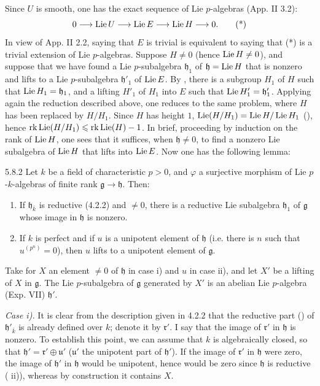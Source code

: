Since $U$ is smooth, one has the exact sequence of Lie $p$-algebras (App. II 3.2):
\[
 0\longrightarrow\operatorname{Lie} U\longrightarrow\operatorname{Lie} E\longrightarrow\operatorname{Lie} H\longrightarrow0.\tag{*}
\]
In view of App. II 2.2, saying that $E$ is trivial is equivalent to saying that (*) is a trivial extension of Lie $p$-algebras. Suppose $H\ne0$ (hence $\operatorname{Lie} H\ne0$), and suppose that we have found a Lie $p$-subalgebra $\mathfrak h_1$ of $\mathfrak h=\operatorname{Lie} H$ that is nonzero and lifts to a Lie $p$-subalgebra $\mathfrak h'_1$ of $\operatorname{Lie} E$. By \loccit, there is a subgroup $H_1$ of $H$ such that $\operatorname{Lie} H_1=\mathfrak h_1$, and a lifting $H'_1$ of $H_1$ into $E$ such that $\operatorname{Lie} H'_1=\mathfrak h'_1$. Applying again the reduction described above, one reduces to the same problem, where $H$ has been replaced by $H/H_1$. Since $H$ has height $1$, $\operatorname{Lie}(H/H_1)=\operatorname{Lie} H/\operatorname{Lie} H_1$ (\loccit), hence $\operatorname{rk}\operatorname{Lie}(H/H_1)\leqslant\operatorname{rk}\operatorname{Lie}(H)-1$. In brief, proceeding by induction on the rank of $\operatorname{Lie} H$, one sees that it suffices, when $\mathfrak h\ne0$, to find a nonzero Lie subalgebra of $\operatorname{Lie} H$ that lifts into $\operatorname{Lie} E$. Now one has the following lemma:
\begin{lemma}{5.8.2}\label{XVII.5.8.2}
Let $k$ be a field of characteristic $p>0$, and $\varphi$ a surjective morphism of Lie $p$-$k$-algebras of finite rank $\mathfrak g\to\mathfrak h$. Then:
\begin{enumerate}[label=\textup{\roman*)}]
\item If $\mathfrak h_{\bar k}$ is reductive (4.2.2) and $\ne0$, there is a reductive Lie subalgebra $\mathfrak h_1$ of $\mathfrak g$ whose image in $\mathfrak h$ is nonzero.
\item If $k$ is perfect and if $u$ is a unipotent element of $\mathfrak h$ (i.e. there is $n$ such that $u^{(p^n)}=0$), then $u$ lifts to a unipotent element of $\mathfrak g$.
\end{enumerate}
\end{lemma}
Take for $X$ an element $\ne0$ of $\mathfrak h$ in case i) and $u$ in case ii), and let $X'$ be a lifting of $X$ in $\mathfrak g$. The Lie $p$-subalgebra of $\mathfrak g$ generated by $X'$ is an abelian Lie $p$-algebra (Exp. VII) $\mathfrak h'$.

\noindent\emph{Case i).} It is clear from the description given in 4.2.2 that the reductive part (\loccit) of $\mathfrak h'_{\bar k}$ is already defined over $k$; denote it by $\mathfrak r'$. I say that the image of $\mathfrak r'$ in $\mathfrak h$ is nonzero. To establish this point, we can assume that $k$ is algebraically closed, so that $\mathfrak h'=\mathfrak r'\oplus\mathfrak u'$ ($\mathfrak u'$ the unipotent part of $\mathfrak h'$). If the image of $\mathfrak r'$ in $\mathfrak h$ were zero, the image of $\mathfrak h'$ in $\mathfrak h$ would be unipotent, hence would be zero since $\mathfrak h$ is reductive ( ii)), whereas by construction it contains $X$.

